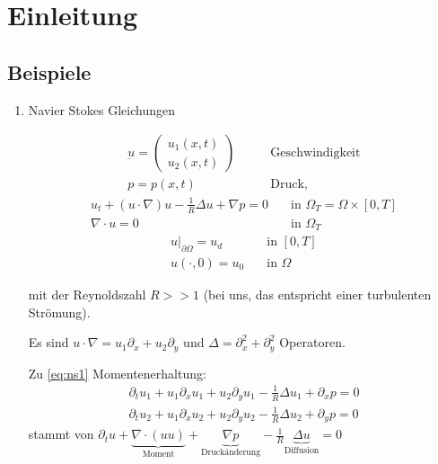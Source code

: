 
\section{Einleitung}
\label{sec:einleitung}

\subsection{Beispiele}
\label{sec:beispiele}

\begin{enumerate}
\item Navier Stokes Gleichungen

  \begin{align*}
    \underbar u =
    \begin{pmatrix}
      u_{1}(x, t)\\
      u_{2}(x, t)
    \end{pmatrix} \qquad &\text{Geschwindigkeit}\\
p = p(x, t) \qquad &\text{Druck}, 
  \end{align*}
  \begin{subequations}
\label{eq:ns}
  \begin{align}
    u_{t} + (u\cdot \nabla)u - \frac 1 R \Delta u + \nabla p = 0\quad &\text{in } \Omega_{T} = \Omega \times [0, T] \label{eq:ns1}\\
\nabla\cdot u = 0 \quad &\text{in } \Omega_{T} \label{eq:ns2}
  \end{align}
  \end{subequations}
  \begin{subequations}
    \label{eq:ns}
    \begin{align}
      u|_{\partial \Omega} = u_{d} \quad &\text{in } [0, T]\label{eq:ns_rb}\\
      u(\cdot, 0)= u_{0} \quad &\text{in } \Omega \label{eq:ns_ab}
    \end{align}
  \end{subequations}

mit der Reynoldszahl $R >> 1$ (bei uns, das entspricht einer turbulenten Strömung). 

Es sind $u\cdot \nabla = u_{1}\partial_{x} + u_{2} \partial_{y}$ und $\Delta = \partial_{x}^{2} + \partial_{y}^{2} $ Operatoren. 

Zu \eqref{eq:ns1} Momentenerhaltung:
\begin{align*}
  \partial_{t}u_{1} + u_{1}\partial_{x}u_{1} + u_{2}\partial_{y}u_{1} -\frac 1 R \Delta u_{1} + \partial_{x} p = 0\\ 
  \partial_{t}u_{2} + u_{1}\partial_{x}u_{2} + u_{2}\partial_{y}u_{2} -\frac 1 R \Delta u_{2} + \partial_{y} p = 0
\end{align*}
stammt von $\partial_{t} u + \underbrace{\nabla\cdot(uu)}_{\text{Moment}} + \underbrace{\nabla p}_{\text{Druckänderung}}-\frac 1 R  \underbrace{\Delta u}_{\text{Diffusion}}  = 0$


\end{enumerate}
